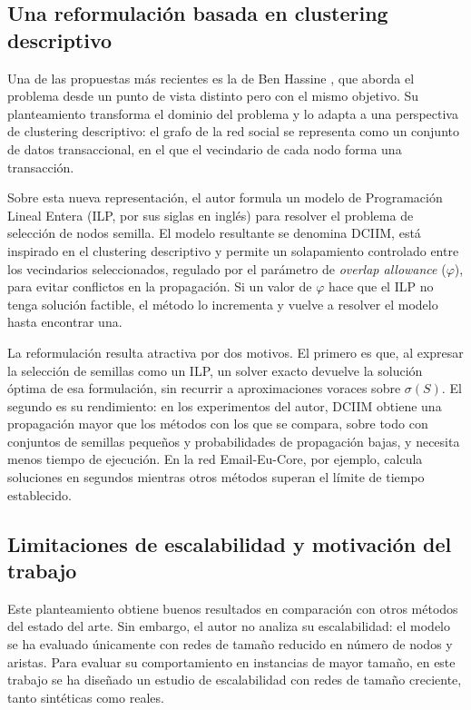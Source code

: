 \documentclass[12pt,twoside,titlepage]{report}
\begin{document}
\subsection{Una reformulación basada en clustering descriptivo} \label{subsec:dciim}

Una de las propuestas más recientes es la de Ben Hassine \cite{motaz}, que aborda el problema desde un punto de vista distinto pero con el mismo objetivo.
Su planteamiento transforma el dominio del problema y lo adapta a una perspectiva de clustering descriptivo: el grafo de la red social se representa como un conjunto de datos transaccional, en el que el vecindario de cada nodo forma una transacción.

Sobre esta nueva representación, el autor formula un modelo de Programación Lineal Entera (ILP, por sus siglas en inglés) para resolver el problema de selección de nodos semilla.
El modelo resultante se denomina DCIIM, está inspirado en el clustering descriptivo y permite un solapamiento controlado entre los vecindarios seleccionados, regulado por el parámetro de \textit{overlap allowance} ($\varphi$), para evitar conflictos en la propagación.
Si un valor de $\varphi$ hace que el ILP no tenga solución factible, el método lo incrementa y vuelve a resolver el modelo hasta encontrar una.

La reformulación resulta atractiva por dos motivos.
El primero es que, al expresar la selección de semillas como un ILP, un solver exacto devuelve la solución óptima de esa formulación, sin recurrir a aproximaciones voraces sobre $\sigma(S)$.
El segundo es su rendimiento: en los experimentos del autor, DCIIM obtiene una propagación mayor que los métodos con los que se compara, sobre todo con conjuntos de semillas pequeños y probabilidades de propagación bajas, y necesita menos tiempo de ejecución.
En la red Email-Eu-Core, por ejemplo, calcula soluciones en segundos mientras otros métodos superan el límite de tiempo establecido.

\subsection{Limitaciones de escalabilidad y motivación del trabajo} \label{subsec:motivacion}

Este planteamiento obtiene buenos resultados en comparación con otros métodos del estado del arte.
Sin embargo, el autor no analiza su escalabilidad: el modelo se ha evaluado únicamente con redes de tamaño reducido en número de nodos y aristas.
Para evaluar su comportamiento en instancias de mayor tamaño, en este trabajo se ha diseñado un estudio de escalabilidad con redes de tamaño creciente, tanto sintéticas como reales.
\end{document}
